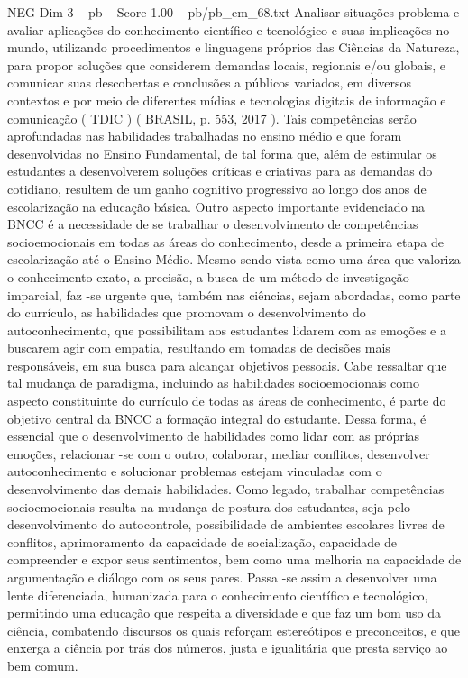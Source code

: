 \begin{textsample}{NEG Dim 3 – pb – Score 1.00 – pb/pb\_em\_68.txt}
Analisar situações-problema e avaliar aplicações do conhecimento científico e tecnológico e suas implicações no mundo, utilizando procedimentos e linguagens próprios das Ciências da Natureza, para propor soluções que considerem demandas locais, regionais e/ou globais, e comunicar suas descobertas e conclusões a públicos variados, em diversos contextos e por meio de diferentes mídias e tecnologias digitais de informação e comunicação ( TDIC ) ( BRASIL, p. 553, 2017 ).
Tais competências serão aprofundadas nas habilidades trabalhadas no ensino médio e que foram desenvolvidas no Ensino Fundamental, de tal forma que, além de estimular os estudantes a desenvolverem soluções críticas e criativas para as demandas do cotidiano, resultem de um ganho cognitivo progressivo ao longo dos anos de escolarização na educação básica.
Outro aspecto importante evidenciado na BNCC é a necessidade de se trabalhar o desenvolvimento de competências socioemocionais em todas as áreas do conhecimento, desde a primeira etapa de escolarização até o Ensino Médio.
Mesmo sendo vista como uma área que valoriza o conhecimento exato, a precisão, a busca de um método de investigação imparcial, faz -se urgente que, também nas ciências, sejam abordadas, como parte do currículo, as habilidades que promovam o desenvolvimento do autoconhecimento, que possibilitam aos estudantes lidarem com as emoções e a buscarem agir com empatia, resultando em tomadas de decisões mais responsáveis, em sua busca para alcançar objetivos pessoais.
Cabe ressaltar que tal mudança de paradigma, incluindo as habilidades socioemocionais como aspecto constituinte do currículo de todas as áreas de conhecimento, é parte do objetivo central da BNCC a formação integral do estudante.
Dessa forma, é essencial que o desenvolvimento de habilidades como lidar com as próprias emoções, relacionar -se com o outro, colaborar, mediar conflitos, desenvolver autoconhecimento e solucionar problemas estejam vinculadas com o desenvolvimento das demais habilidades.
Como legado, trabalhar competências socioemocionais resulta na mudança de postura dos estudantes, seja pelo desenvolvimento do autocontrole, possibilidade de ambientes escolares livres de conflitos, aprimoramento da capacidade de socialização, capacidade de compreender e expor seus sentimentos, bem como uma melhoria na capacidade de argumentação e diálogo com os seus pares.
Passa -se assim a desenvolver uma lente diferenciada, humanizada para o conhecimento científico e tecnológico, permitindo uma educação que respeita a diversidade e que faz um bom uso da ciência, combatendo discursos os quais reforçam estereótipos e preconceitos, e que enxerga a ciência por trás dos números, justa e igualitária que presta serviço ao bem comum.

\end{textsample}
